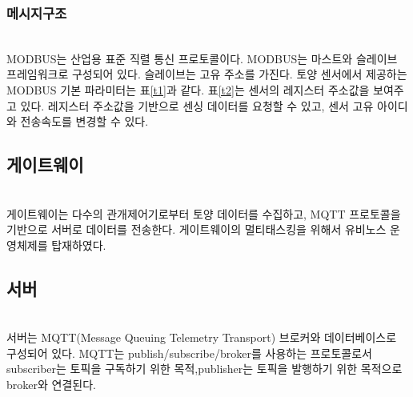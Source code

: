 \documentclass[11pt]{article}
\begin{document}

\subsubsection{메시지구조}
\indent \\MODBUS는 산업용 표준 직렬 통신 프로토콜이다. MODBUS는 마스트와 슬레이브 프레임워크로 구성되어 있다. 슬레이브는 고유 주소를 가진다. 토양 센서에서 제공하는 MODBUS 기본 파라미터는 표\ref{t1}과 같다. 표\ref{t2}는 센서의 레지스터 주소값을 보여주고 있다. 레지스터 주소값을 기반으로 센싱 데이터를 요청할 수 있고, 센서 고유 아이디와 전송속도를 변경할 수 있다. %
 

\subsection{게이트웨이}
\indent \\게이트웨이는 다수의 관개제어기로부터 토양 데이터를 수집하고, MQTT 프로토콜을 기반으로 서버로 데이터를 전송한다. 게이트웨이의 멀티태스킹을 위해서 유비노스 운영체제를 탑재하였다. 

\subsection{서버}
\indent \\서버는 MQTT(Message Queuing Telemetry Transport) 브로커와 데이터베이스로 구성되어 있다. MQTT는 publish/subscribe/broker를 사용하는 프로토콜로서 subscriber는 토픽을 구독하기 위한 목적,publisher는 토픽을 발행하기 위한 목적으로 broker와 연결된다. 
\end{document}
